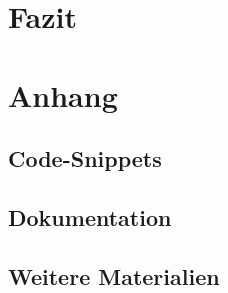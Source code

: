 \chapter{Fazit}\label{Chap:Fazit}

\chapter{Anhang}
\section{Code-Snippets}
\section{Dokumentation}
\section{Weitere Materialien}
